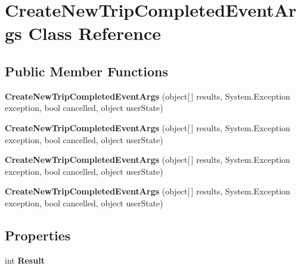 \hypertarget{class_create_new_trip_completed_event_args}{
\section{CreateNewTripCompletedEventArgs Class Reference}
\label{class_create_new_trip_completed_event_args}
}
\subsection*{Public Member Functions}
\begin{DoxyCompactItemize}
\item 
\hypertarget{class_create_new_trip_completed_event_args_abea0baa788b789c0715bd8e04a875a6a}{
{\bfseries CreateNewTripCompletedEventArgs} (object\mbox{[}$\,$\mbox{]} results, System.Exception exception, bool cancelled, object userState)}
\label{class_create_new_trip_completed_event_args_abea0baa788b789c0715bd8e04a875a6a}

\item 
\hypertarget{class_create_new_trip_completed_event_args_abea0baa788b789c0715bd8e04a875a6a}{
{\bfseries CreateNewTripCompletedEventArgs} (object\mbox{[}$\,$\mbox{]} results, System.Exception exception, bool cancelled, object userState)}
\label{class_create_new_trip_completed_event_args_abea0baa788b789c0715bd8e04a875a6a}

\item 
\hypertarget{class_create_new_trip_completed_event_args_abea0baa788b789c0715bd8e04a875a6a}{
{\bfseries CreateNewTripCompletedEventArgs} (object\mbox{[}$\,$\mbox{]} results, System.Exception exception, bool cancelled, object userState)}
\label{class_create_new_trip_completed_event_args_abea0baa788b789c0715bd8e04a875a6a}

\item 
\hypertarget{class_create_new_trip_completed_event_args_abea0baa788b789c0715bd8e04a875a6a}{
{\bfseries CreateNewTripCompletedEventArgs} (object\mbox{[}$\,$\mbox{]} results, System.Exception exception, bool cancelled, object userState)}
\label{class_create_new_trip_completed_event_args_abea0baa788b789c0715bd8e04a875a6a}

\end{DoxyCompactItemize}
\subsection*{Properties}
\begin{DoxyCompactItemize}
\item 
\hypertarget{class_create_new_trip_completed_event_args_ad5f7452fb442068607efb17ce4e94c9d}{
int {\bfseries Result}}
\label{class_create_new_trip_completed_event_args_ad5f7452fb442068607efb17ce4e94c9d}

\end{DoxyCompactItemize}


